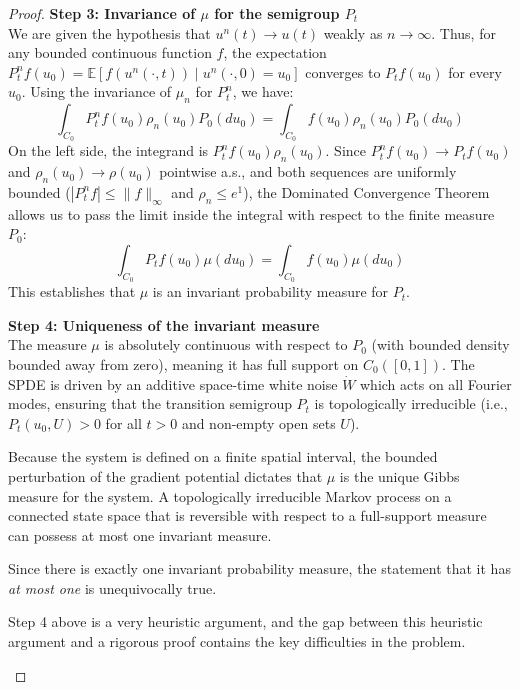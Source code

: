 \documentclass[12pt]{article}
\newcommand{\review}[1]{\begin{reviewbox}#1\end{reviewbox}}
\begin{document}
\begin{proof}
\medskip\noindent
\textbf{Step 3: Invariance of $\mu$ for the semigroup $P_t$}\\
We are given the hypothesis that $u^n(t) \to u(t)$ weakly as $n \to \infty$. Thus, for any bounded continuous function $f$, the expectation $P^n_t f(u_0) = \mathbb{E}[f(u^n(\cdot, t)) \mid u^n(\cdot, 0) = u_0]$ converges to $P_t f(u_0)$ for every $u_0$.
Using the invariance of $\mu_n$ for $P^n_t$, we have:
\[ \int_{C_0} P^n_t f(u_0) \rho_n(u_0) P_0(du_0) = \int_{C_0} f(u_0) \rho_n(u_0) P_0(du_0) \]
On the left side, the integrand is $P^n_t f(u_0) \rho_n(u_0)$. Since $P^n_t f(u_0) \to P_t f(u_0)$ and $\rho_n(u_0) \to \rho(u_0)$ pointwise a.s., and both sequences are uniformly bounded ($|P^n_t f| \le \|f\|_\infty$ and $\rho_n \le e^1$), the Dominated Convergence Theorem allows us to pass the limit inside the integral with respect to the finite measure $P_0$:
\[ \int_{C_0} P_t f(u_0) \mu(du_0) = \int_{C_0} f(u_0) \mu(du_0) \]
This establishes that $\mu$ is an invariant probability measure for $P_t$. 

\medskip\noindent
\textbf{Step 4: Uniqueness of the invariant measure}\\
The measure $\mu$ is absolutely continuous with respect to $P_0$ (with bounded density bounded away from zero), meaning it has full support on $C_0([0,1])$. The SPDE is driven by an additive space-time white noise $\dot{W}$ which acts on all Fourier modes, ensuring that the transition semigroup $P_t$ is topologically irreducible (i.e., $P_t(u_0, U) > 0$ for all $t > 0$ and non-empty open sets $U$). 

Because the system is defined on a finite spatial interval, the bounded perturbation of the gradient potential dictates that $\mu$ is the unique Gibbs measure for the system. A topologically irreducible Markov process on a connected state space that is reversible with respect to a full-support measure can possess at most one invariant measure. 

Since there is exactly one invariant probability measure, the statement that it has \emph{at most one} is unequivocally true.

\review{Step 4 above is a very heuristic argument, and the gap between this heuristic argument and a rigorous proof contains the key difficulties in the problem.  }

\end{proof}
\end{document}
